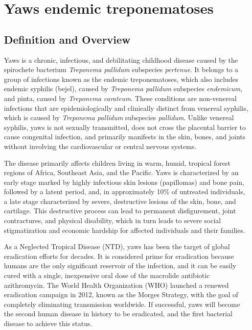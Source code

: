 \chapter{Yaws endemic treponematoses}

\section*{Definition and Overview}
Yaws is a chronic, infectious, and debilitating childhood disease caused by the spirochete bacterium \textit{Treponema pallidum} subspecies \textit{pertenue}. It belongs to a group of infections known as the endemic treponematoses, which also includes endemic syphilis (bejel), caused by \textit{Treponema pallidum} subspecies \textit{endemicum}, and pinta, caused by \textit{Treponema carateum}. These conditions are non-venereal infections that are epidemiologically and clinically distinct from venereal syphilis, which is caused by \textit{Treponema pallidum} subspecies \textit{pallidum}. Unlike venereal syphilis, yaws is not sexually transmitted, does not cross the placental barrier to cause congenital infection, and primarily manifests in the skin, bones, and joints without involving the cardiovascular or central nervous systems.

The disease primarily affects children living in warm, humid, tropical forest regions of Africa, Southeast Asia, and the Pacific. Yaws is characterized by an early stage marked by highly infectious skin lesions (papillomas) and bone pain, followed by a latent period, and, in approximately 10\% of untreated individuals, a late stage characterized by severe, destructive lesions of the skin, bone, and cartilage. This destructive process can lead to permanent disfigurement, joint contractures, and physical disability, which in turn leads to severe social stigmatization and economic hardship for affected individuals and their families.

As a Neglected Tropical Disease (NTD), yaws has been the target of global eradication efforts for decades. It is considered prime for eradication because humans are the only significant reservoir of the infection, and it can be easily cured with a single, inexpensive oral dose of the macrolide antibiotic azithromycin. The World Health Organization (WHO) launched a renewed eradication campaign in 2012, known as the Morges Strategy, with the goal of completely eliminating transmission worldwide. If successful, yaws will become the second human disease in history to be eradicated, and the first bacterial disease to achieve this status.

